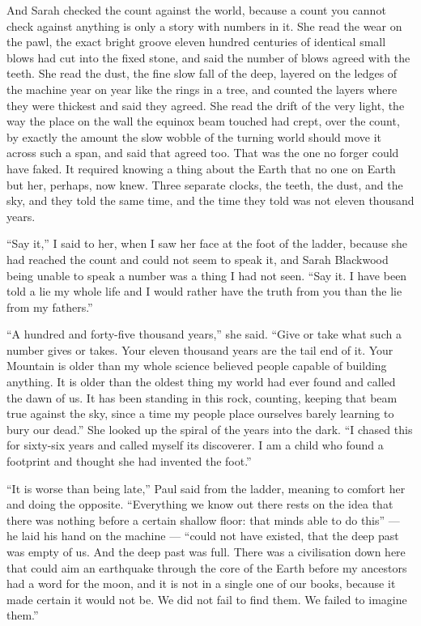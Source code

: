 And Sarah checked the count against the world, because a count you cannot check against anything is only a story with numbers in it. She read the wear on the pawl, the exact bright groove eleven hundred centuries of identical small blows had cut into the fixed stone, and said the number of blows agreed with the teeth. She read the dust, the fine slow fall of the deep, layered on the ledges of the machine year on year like the rings in a tree, and counted the layers where they were thickest and said they agreed. She read the drift of the very light, the way the place on the wall the equinox beam touched had crept, over the count, by exactly the amount the slow wobble of the turning world should move it across such a span, and said that agreed too. That was the one no forger could have faked. It required knowing a thing about the Earth that no one on Earth but her, perhaps, now knew. Three separate clocks, the teeth, the dust, and the sky, and they told the same time, and the time they told was not eleven thousand years.\par

``Say it,'' I said to her, when I saw her face at the foot of the ladder, because she had reached the count and could not seem to speak it, and Sarah Blackwood being unable to speak a number was a thing I had not seen. ``Say it. I have been told a lie my whole life and I would rather have the truth from you than the lie from my fathers.''\par

``A hundred and forty-five thousand years,'' she said. ``Give or take what such a number gives or takes. Your eleven thousand years are the tail end of it. Your Mountain is older than my whole science believed people capable of building anything. It is older than the oldest thing my world had ever found and called the dawn of us. It has been standing in this rock, counting, keeping that beam true against the sky, since a time my people place ourselves barely learning to bury our dead.'' She looked up the spiral of the years into the dark. ``I chased this for sixty-six years and called myself its discoverer. I am a child who found a footprint and thought she had invented the foot.''\par

``It is worse than being late,'' Paul said from the ladder, meaning to comfort her and doing the opposite. ``Everything we know out there rests on the idea that there was nothing before a certain shallow floor: that minds able to do this'' --- he laid his hand on the machine --- ``could not have existed, that the deep past was empty of us. And the deep past was full. There was a civilisation down here that could aim an earthquake through the core of the Earth before my ancestors had a word for the moon, and it is not in a single one of our books, because it made certain it would not be. We did not fail to find them. We failed to imagine them.''\par

